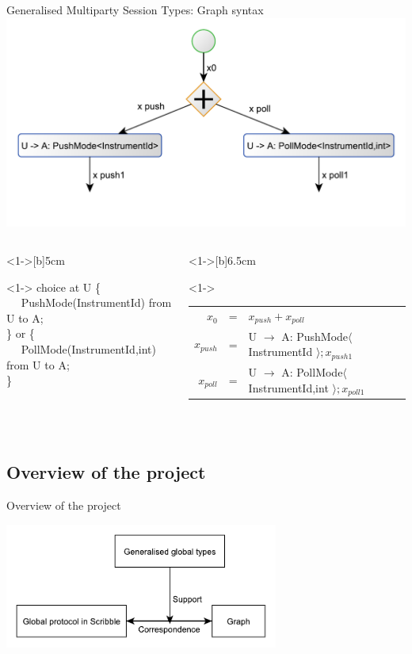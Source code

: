 \documentclass[8 pt]{beamer}
\newcommand{\BLUE}{\color[rgb]{0,0,0.69}}
\begin{document}
\begin{frame}{Generalised Multiparty Session Types: Graph syntax}
\includegraphics[scale=0.55]{ooi_graph_details}
\begin{columns}
\begin{column}<1->[b]{5cm}
\begin{exampleblock}<1->{}
{\BLUE choice at} U \{ \\
~~	PushMode(InstrumentId) {\BLUE from} U {\BLUE to} A;\\
\} {\BLUE or} \{ \\
~~	PollMode(InstrumentId,int) {\BLUE from} U {\BLUE to} A;\\
\}
\end{exampleblock}
\end{column}
\begin{column}<1->[b]{6.5cm}
\begin{block}<1->{}
\begin{tabular}{rcl}
$x_{0}$ &=& $x_{push} + x_{poll}$\\
$x_{push}$ &=& U $\rightarrow$ A: PushMode$\langle$ InstrumentId $\rangle ; x_{push1}$\\
$x_{poll}$ &=& U $\rightarrow$ A: PollMode$\langle$ InstrumentId,int $\rangle ; x_{poll1}$\\
\end{tabular}
\end{block}
~~\\
\end{column}
\end{columns}
\end{frame}

\subsection{Overview of the project}

\begin{frame}{Overview of the project}
\begin{center}
\includegraphics[width=9cm]{architecture2}
\end{center}
\end{frame}
\end{document}
